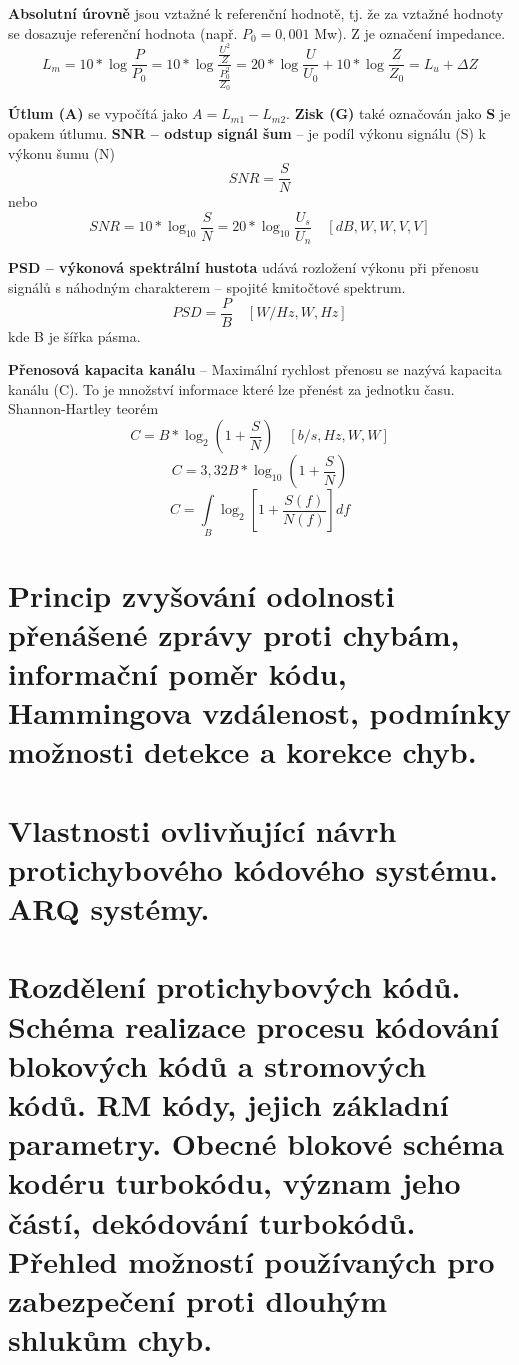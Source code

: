 \textbf{Absolutní úrovně} jsou vztažné k referenční hodnotě, tj. že za vztažné hodnoty se dosazuje referenční hodnota (např. $P_0 = 0,001$ Mw). Z je označení impedance.
\[L_m = 10*\log\frac{P}{P_0} = 10*\log\frac{\frac{U^2}{Z}}{\frac{P^2_0}{Z_0}} = 20*\log\frac{U}{U_0} + 10*\log\frac{Z}{Z_0} = L_u + \Delta Z\]

\textbf{Útlum (A)} se vypočítá jako $A = L_{m1} - L_{m2}$.
\newline\textbf{Zisk (G)} také označován jako \textbf{S} je opakem útlumu.
\newline\textbf{SNR -- odstup signál šum} -- je podíl výkonu signálu (S) k výkonu šumu (N)\[SNR = \frac{S}{N}\] nebo \[SNR = 10*\log_{10}\frac{S}{N} = 20*\log_{10}\frac{U_s}{U_n} \quad [dB, W, W, V, V]\]

\textbf{PSD -- výkonová spektrální hustota} udává rozložení výkonu při přenosu signálů s náhodným charakterem -- spojité kmitočtové spektrum. \[PSD = \frac{P}{B} \quad [W/Hz, W, Hz]\] kde B je šířka pásma.

\textbf{Přenosová kapacita kanálu} -- Maximální rychlost přenosu se nazývá kapacita kanálu (C). To je množství informace které lze přenést za jednotku času. Shannon-Hartley teorém
\[C = B*\log_2(1 + \frac{S}{N}) \quad [b/s, Hz, W, W]\]
\[C = 3,32B*\log_10(1 + \frac{S}{N})\]
\[C = \int\limits_B{\log_2\left[1 + \frac{S(f)}{N(f)}\right]df}\]

\clearpage
\section{Princip zvyšování odolnosti přenášené zprávy proti chybám, informační poměr kódu, Hammingova vzdálenost, podmínky možnosti detekce a korekce chyb.}

\clearpage
\section{Vlastnosti ovlivňující návrh protichybového kódového systému. ARQ systémy.}

\clearpage
\section{Rozdělení protichybových kódů. Schéma realizace procesu kódování blokových kódů a stromových kódů. RM kódy, jejich základní parametry. Obecné blokové schéma kodéru turbokódu, význam jeho částí, dekódování turbokódů. Přehled možností používaných pro zabezpečení proti dlouhým shlukům chyb.}

